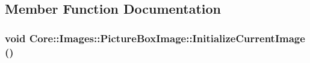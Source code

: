 \subsection{Member Function Documentation}
\hypertarget{class_core_1_1_images_1_1_picture_box_image_a45f1dfefcd6edffac692a1e0b15a2a8e}{
\subsubsection[{InitializeCurrentImage}]{\setlength{\rightskip}{0pt plus 5cm}void Core::Images::PictureBoxImage::InitializeCurrentImage ()}}
\label{class_core_1_1_images_1_1_picture_box_image_a45f1dfefcd6edffac692a1e0b15a2a8e}


